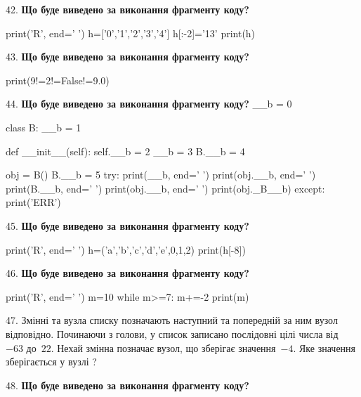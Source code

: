 \documentclass[11pt]{article}
\begin{document}
42. \textbf{Що буде виведено за виконання фрагменту коду?}

print('R', end=' ')
h=['0','1','2','3','4']
h[:-2]='13'
print(h)

\par\vspace{5mm}

43. \textbf{Що буде виведено за виконання фрагменту коду?}

print(9!=2!=False!=9.0)
\par\vspace{5mm}

44. \textbf{Що буде виведено за виконання фрагменту коду?}
__b = 0

class B:
    __b = 1
    
    def __init__(self):
        self.__b = 2
        __b = 3
        B.__b = 4

obj = B()
B.__b = 5
try:
    print(__b, end=' ')
    print(obj.__b, end=' ')
    print(B.__b, end=' ')
    print(obj.__b, end=' ')
    print(obj._B__b)
except:
    print('ERR')
\par\vspace{5mm}

45. \textbf{Що буде виведено за виконання фрагменту коду?}

print('R', end=' ')
h=('a','b','c','d','e',0,1,2)
print(h[-8])

\par\vspace{5mm}

46. \textbf{Що буде виведено за виконання фрагменту коду?}

print('R', end=' ')
m=10
while m>=7:
    m+=-2
print(m)

\par\vspace{5mm}

47. 
Змінні  та  вузла списку позначають наступний та попередній за ним вузол відповідно. Починаючи з голови, у список записано послідовні цілі числа від~$-63$ до~$22$. Нехай змінна  позначає вузол, що зберігає значення~$-4$.
Яке значення зберігається у вузлі  ?
\par\vspace{5mm}

48. \textbf{Що буде виведено за виконання фрагменту коду?}
\end{document}
